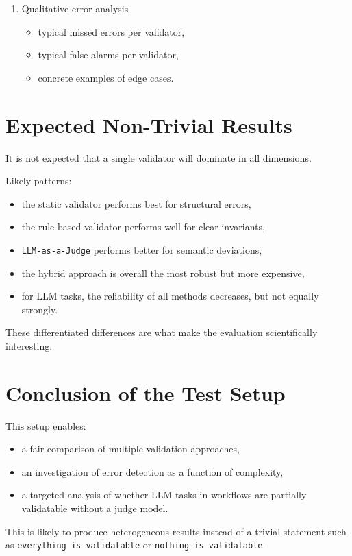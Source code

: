 \documentclass[12pt,a4paper]{article}
\begin{document}
\begin{enumerate}
\begin{itemize}
    \item Does the performance gain justify the additional token cost?
    \item Which method is most efficient for practical use?
  \end{itemize}
  \item Qualitative error analysis
  \begin{itemize}
    \item typical missed errors per validator,
    \item typical false alarms per validator,
    \item concrete examples of edge cases.
  \end{itemize}
\end{enumerate}

\section{Expected Non-Trivial Results}

It is not expected that a single validator will dominate in all dimensions.

Likely patterns:

\begin{itemize}
  \item the static validator performs best for structural errors,
  \item the rule-based validator performs well for clear invariants,
  \item \texttt{LLM-as-a-Judge} performs better for semantic deviations,
  \item the hybrid approach is overall the most robust but more expensive,
  \item for LLM tasks, the reliability of all methods decreases, but not equally strongly.
\end{itemize}

These differentiated differences are what make the evaluation scientifically interesting.

\section{Conclusion of the Test Setup}

This setup enables:

\begin{itemize}
  \item a fair comparison of multiple validation approaches,
  \item an investigation of error detection as a function of complexity,
  \item a targeted analysis of whether LLM tasks in workflows are partially validatable without a judge model.
\end{itemize}

This is likely to produce heterogeneous results instead of a trivial statement such as \texttt{everything is validatable} or \texttt{nothing is validatable}.
\end{document}
